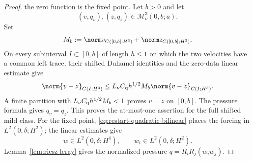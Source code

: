 \begin{proof}
the zero function is the fixed point.  Let \(b>0\) and let
\[
 (v,q_v),(z,q_z)\in\mathscr M_\nu^3(0,b;a).
\]
Set
\[
 M_b:=\norm v_{C([0,b];H^3)}+\norm z_{C([0,b];H^3)}.
\]
On every subinterval \(I\subset[0,b]\) of length \(h\le1\) on which the two
velocities have a common left trace, their shifted Duhamel identities and the
zero-data linear estimate give
\[
 \norm{v-z}_{C(I;H^3)}
 \le L_\nu C_{\rm q}h^{1/2}M_b
 \norm{v-z}_{C(I;H^3)}.
\]
A finite partition with
\(L_\nu C_{\rm q}h^{1/2}M_b<1\) proves \(v=z\) on \([0,b]\).
The pressure formula gives \(q_v=q_z\).  This proves the at-most-one
assertion for the full shifted mild class.  For the fixed point,
\eqref{eq:restart-quadratic-bilinear} places the forcing in
\(L^2(0,\delta;H^2)\); the linear estimates give
\[
 w\in L^2(0,\delta;H^4),
 \qquad
 w_t\in L^2(0,\delta;H^2).
\]
Lemma~\ref{lem:riesz-leray} gives the normalized pressure
\(q=R_iR_j(w_iw_j)\).


\end{proof}
